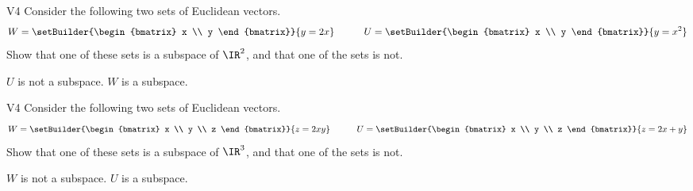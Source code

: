 \begin{problem}{V4}
Consider the following two sets of Euclidean vectors.
\[
  W = \setBuilder{\begin{bmatrix} x \\ y \end{bmatrix}}{y=2x}
\hspace{3em}
  U = \setBuilder{\begin{bmatrix} x \\ y \end{bmatrix}}{y=x^2}
\]
Show that one of these sets is a subspace of \(\IR^2\), and
that one of the sets is not.
\end{problem}
\begin{solution}
\(U\) is not a subspace.
\(W\) is a subspace.
\end{solution}


\begin{problem}{V4}
Consider the following two sets of Euclidean vectors.
\[
  W = \setBuilder{\begin{bmatrix} x \\ y \\ z \end{bmatrix}}{z=2xy}
\hspace{3em}
  U = \setBuilder{\begin{bmatrix} x \\ y \\ z \end{bmatrix}}{z=2x+y}
\]
Show that one of these sets is a subspace of \(\IR^3\), and
that one of the sets is not.
\end{problem}
\begin{solution}
\(W\) is not a subspace.
\(U\) is a subspace.
\end{solution}
